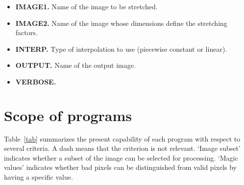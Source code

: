 \begin{itemize}
\item {\bf IMAGE1.} Name of the image to be stretched.
\item {\bf IMAGE2.} Name of the image whose dimensions define the stretching
factors.
\item {\bf INTERP.} Type of interpolation to use (piecewise constant or
linear).
\item {\bf OUTPUT.} Name of the output image.
\item {\bf VERBOSE.}
\end{itemize}

\section{Scope of programs}

Table~\ref{tab} summarizes the present capability of each program with respect 
to several criteria. A dash means that the criterion is not relevant.
`Image subset' indicates whether a subset of the image can be selected for 
processing. `Magic values' indicates whether bad pixels can be distinguished
from valid pixels by having a specific value.    

